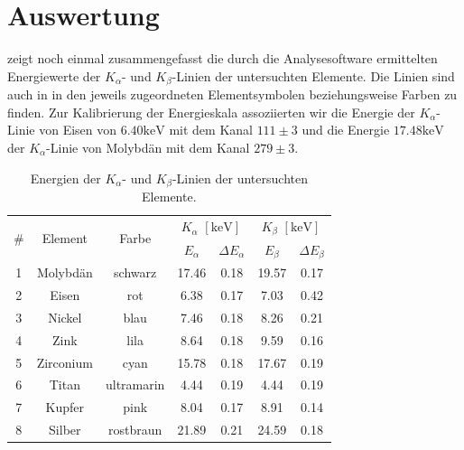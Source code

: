 \section{Auswertung}

 zeigt noch einmal zusammengefasst die durch die Analysesoftware ermittelten Energiewerte der $K_{\alpha}$- und $K_{\beta}$-Linien der untersuchten Elemente. Die Linien sind auch in  in den jeweils zugeordneten Elementsymbolen beziehungsweise Farben zu finden. Zur Kalibrierung der Energieskala assoziierten wir die Energie der $K_\alpha$-Linie von Eisen von $6.40\si{\kilo\electronvolt}$ mit dem Kanal $111 \pm 3$ und die Energie $17.48\si{\kilo\electronvolt}$ der $K_\alpha$-Linie von Molybdän mit dem Kanal $279 \pm 3$.


\begin{table}[H]
  \centering
  \begin{tabular}{|c|c|c|c c|c c|}
      \hline
      \multirow{2}{*}{\#} & \multirow{2}{*}{Element}  & \multirow{2}{*}{Farbe}  & \multicolumn{2}{c|}{$K_{\alpha}$ $[\si{\kilo\electronvolt}]$}  & \multicolumn{2}{c|}{$K_{\beta}$ $[\si{\kilo\electronvolt}]$} \\\cline{4-7}
      && & $E_{\alpha}$ & $\Delta E_{\alpha}$ & $E_{\beta}$ & $\Delta E_{\beta}$ \\
      \hline
      1  & Molybdän  & schwarz    & 17.46 & 0.18 & 19.57 & 0.17 \\
      2  & Eisen     & rot        & 6.38  & 0.17 & 7.03  & 0.42 \\
      3  & Nickel    & blau       & 7.46  & 0.18 & 8.26  & 0.21 \\
      4  & Zink      & lila       & 8.64  & 0.18 & 9.59  & 0.16 \\
      5  & Zirconium & cyan       & 15.78 & 0.18 & 17.67 & 0.19 \\
      6  & Titan     & ultramarin & 4.44  & 0.19 & 4.44  & 0.19 \\
      7  & Kupfer    & pink       & 8.04  & 0.17 & 8.91  & 0.14 \\
      8  & Silber    & rostbraun  & 21.89 & 0.21 & 24.59 & 0.18 \\
      \hline
  \end{tabular}
  \caption{Energien der $K_{\alpha}$- und $K_{\beta}$-Linien der untersuchten Elemente.}
  \label{tab:elemente_kalph_kbeta}
\end{table}

